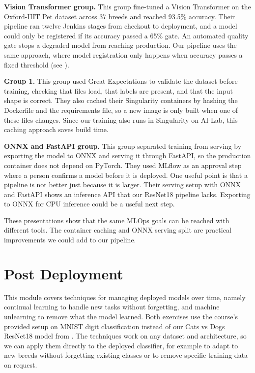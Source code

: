 \documentclass[10pt,twocolumn,letterpaper]{article}
\begin{document}
\textbf{Vision Transformer group.} This group fine-tuned a Vision Transformer on the Oxford-IIIT Pet dataset across 37 breeds and reached 93.5\% accuracy. Their pipeline ran twelve Jenkins stages from checkout to deployment, and a model could only be registered if its accuracy passed a 65\% gate. An automated quality gate stops a degraded model from reaching production. Our pipeline uses the same approach, where model registration only happens when accuracy passes a fixed threshold (see ).

\textbf{Group 1.} This group used Great Expectations to validate the dataset before training, checking that files load, that labels are present, and that the input shape is correct. They also cached their Singularity containers by hashing the Dockerfile and the requirements file, so a new image is only built when one of these files changes. Since our training also runs in Singularity on AI-Lab, this caching approach saves build time.

\textbf{ONNX and FastAPI group.} This group separated training from serving by exporting the model to ONNX and serving it through FastAPI, so the production container does not depend on PyTorch. They used MLflow as an approval step where a person confirms a model before it is deployed. One useful point is that a pipeline is not better just because it is larger. Their serving setup with ONNX and FastAPI shows an inference API that our ResNet18 pipeline lacks. Exporting to ONNX for CPU inference could be a useful next step.

These presentations show that the same MLOps goals can be reached with different tools. The container caching and ONNX serving split are practical improvements we could add to our pipeline.

\section{Post Deployment}\label{sec:post-deployment}

This module covers techniques for managing deployed models over time, namely continual learning to handle new tasks without forgetting, and machine unlearning to remove what the model learned. Both exercises use the course's provided setup on MNIST digit classification instead of our Cats vs Dogs ResNet18 model from . The techniques work on any dataset and architecture, so we can apply them directly to the deployed classifier, for example to adapt to new breeds without forgetting existing classes or to remove specific training data on request.
\end{document}
